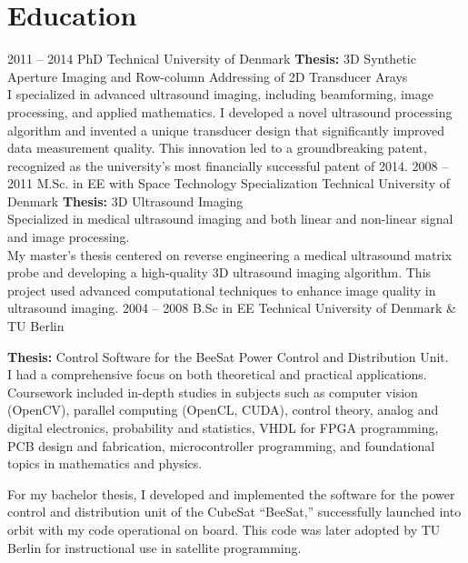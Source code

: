 \documentclass[8pt]{mofiicv}
\begin{document}
\begin{minipage}[T]{\SecondColumnWidth}
\section{Education}
\begin{entrylist}
	\entry
		{2011 -- 2014}
		{PhD}
		{Technical University of Denmark}
		{\textbf{Thesis:} 3D Synthetic Aperture Imaging and Row-column Addressing of 2D Transducer Arays\\
		I specialized in advanced ultrasound imaging, including beamforming, image processing, and applied mathematics. I developed a novel ultrasound processing algorithm and invented a unique transducer design that significantly improved data measurement quality. This innovation led to a groundbreaking patent, recognized as the university's most financially successful patent of 2014.}
	\entry
		{2008 -- 2011}
		{M.Sc. in EE with Space Technology Specialization}
		{Technical University of Denmark}
		{\textbf{Thesis:} 3D Ultrasound Imaging\\
		Specialized in medical ultrasound imaging and both linear and non-linear signal and image processing.\\
		My master's thesis centered on reverse engineering a medical ultrasound matrix probe and developing a high-quality 3D ultrasound imaging algorithm. 
		This project used advanced computational techniques to enhance image quality in ultrasound imaging.}
	\entry
		{2004 -- 2008}
		{B.Sc in EE}
		{Technical University of Denmark \& TU Berlin} 
		{\textbf{Thesis:} Control Software for the BeeSat Power Control and Distribution Unit.\\
		I had a comprehensive focus on both theoretical and practical applications. Coursework included 
		in-depth studies in subjects such as computer vision (OpenCV), parallel computing (OpenCL, CUDA), control theory, analog and digital electronics, probability 
		and statistics, VHDL for FPGA programming, PCB design and fabrication, microcontroller programming, and foundational topics in mathematics and physics.

		For my bachelor thesis, I developed and implemented the software for the power control and distribution unit of the CubeSat “BeeSat,” successfully 
		launched into orbit with my code operational on board. This code was later adopted by TU Berlin for instructional use in satellite programming.}
\end{entrylist}
\end{minipage}
\end{document}
